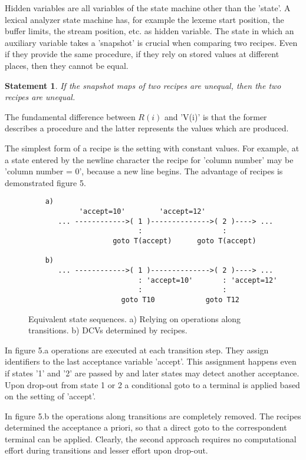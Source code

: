 \documentclass[12pt,a4paper]{scrartcl}
\theoremstyle{break}
\newtheorem{statement}{Statement}
\begin{document}
Hidden variables are all variables of the state machine other than the 'state'.
A lexical analyzer state machine has, for example the lexeme start position,
the buffer limits, the stream position, etc. as hidden variable. The state
in which an auxiliary variable takes a 'snapshot' is crucial when comparing
two recipes. Even if they provide the same procedure, if they rely on stored
values at different places, then they cannot be equal.

\begin{statement}
   If the snapshot maps of two recipes are unequal, then the two recipes
   are unequal.
\end{statement}

The fundamental difference between $R(i)$ and 'V(i)' is that the former describes
a procedure and the latter represents the values which are produced.

The simplest form of a recipe is the setting with constant values.  For
example, at a state entered by the newline character the recipe for 'column
number' may be 'column number = 0', because a new line begins. The advantage of
recipes is demonstrated figure 5.


\begin{figure}[htbp] \leavevmode
\begin{verbatim}
    a)        
            'accept=10'        'accept=12'        
       ... ------------>( 1 )-------------->( 2 )----> ...
                          :                   :
                    goto T(accept)      goto T(accept)

    b) 
       ... ------------>( 1 )-------------->( 2 )----> ...
                          : 'accept=10'       : 'accept=12'              
                          :                   :
                      goto T10            goto T12

\end{verbatim}
\caption{Equivalent state sequences. a) Relying on operations along
transitions. b) DCVs determined by recipes.}
\end{figure}

In figure 5.a operations are executed at each transition step. They assign
identifiers to the last acceptance variable 'accept'. This assignment happens
even if states '1' and '2' are passed by and later states may detect another
acceptance. Upon drop-out from state 1 or 2 a conditional goto to a terminal is
applied based on the setting of 'accept'. 

In figure 5.b the operations along transitions are completely removed. The
recipes determined the acceptance a priori, so that a direct goto to the
correspondent terminal can be applied.  Clearly, the second approach requires
no computational effort during transitions and lesser effort upon drop-out.
\end{document}
